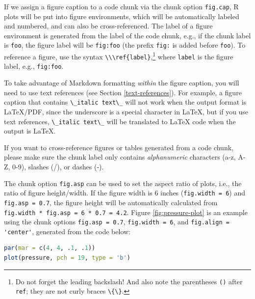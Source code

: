 \documentclass[doctor,openright,twoside]{sjtuthesis}
\newcommand{\passthrough}[1]{#1}
\theoremstyle{plain}
\theoremstyle{definition}
\theoremstyle{remark}
\theoremstyle{ocrenumbox}
\theoremstyle{plain}
\let\BeginKnitrBlock\begin \let\EndKnitrBlock\end
\begin{document}
If we assign a figure caption to a code chunk via the chunk option \passthrough{\lstinline!fig.cap!}, R plots will be put into figure environments, which will be automatically labeled and numbered, and can also be cross-referenced. The label of a figure environment is generated from the label of the code chunk, e.g., if the chunk label is \passthrough{\lstinline!foo!}, the figure label will be \passthrough{\lstinline!fig:foo!} (the prefix \passthrough{\lstinline!fig:!} is added before \passthrough{\lstinline!foo!}). To reference a figure, use the syntax \passthrough{\lstinline!\\\ref{label}!},\footnote{Do not forget the leading backslash! And also note the parentheses \passthrough{\lstinline!()!} after \passthrough{\lstinline!ref!}; they are not curly braces \passthrough{\lstinline!\{\}!}.} where \passthrough{\lstinline!label!} is the figure label, e.g., \passthrough{\lstinline!fig:foo!}.

To take advantage of Markdown formatting \emph{within} the figure caption, you will need to use text references (see Section \ref{text-references}). For example, a figure caption that contains \passthrough{\lstinline!\_italic text\_!} will not work when the output format is LaTeX/PDF, since the underscore is a special character in LaTeX, but if you use text references, \passthrough{\lstinline!\_italic text\_!} will be translated to LaTeX code when the output is LaTeX.

\BeginKnitrBlock{rmdimportant}
If you want to cross-reference figures or tables generated from a code chunk, please make sure the chunk label only contains \emph{alphanumeric} characters (a-z, A-Z, 0-9), slashes (/), or dashes (-).
\EndKnitrBlock{rmdimportant}

The chunk option \passthrough{\lstinline!fig.asp!} can be used to set the aspect ratio of plots, i.e., the ratio of figure height/width. If the figure width is 6 inches (\passthrough{\lstinline!fig.width = 6!}) and \passthrough{\lstinline!fig.asp = 0.7!}, the figure height will be automatically calculated from \passthrough{\lstinline!fig.width * fig.asp = 6 * 0.7 = 4.2!}. Figure \ref{fig:pressure-plot} is an example using the chunk options \passthrough{\lstinline!fig.asp = 0.7!}, \passthrough{\lstinline!fig.width = 6!}, and \passthrough{\lstinline!fig.align = 'center'!}, generated from the code below:

\begin{lstlisting}[language=R]
par(mar = c(4, 4, .1, .1))
plot(pressure, pch = 19, type = 'b')
\end{lstlisting}
\end{document}
